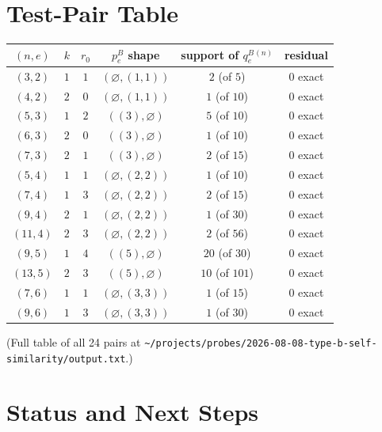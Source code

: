 \documentclass[11pt]{article}
\theoremstyle{remark}
\newcommand{\qeB}{q_e^B}
\newcommand{\peB}{p_e^B}
\newcommand{\emptyy}{\varnothing}
\begin{document}
\section{Test-Pair Table}

\begin{center}
\begin{tabular}{|c|c|c|c|c|c|}
\hline
$(n, e)$ & $k$ & $r_0$ & $\peB$ shape & support of $\qeB^{(n)}$ & residual \\
\hline
$(3, 2)$  & $1$ & $1$ & $(\emptyy, (1,1))$ & $2$ (of $5$)   & $0$ exact \\
$(4, 2)$  & $2$ & $0$ & $(\emptyy, (1,1))$ & $1$ (of $10$)  & $0$ exact \\
$(5, 3)$  & $1$ & $2$ & $((3), \emptyy)$   & $5$ (of $10$)  & $0$ exact \\
$(6, 3)$  & $2$ & $0$ & $((3), \emptyy)$   & $1$ (of $10$)  & $0$ exact \\
$(7, 3)$  & $2$ & $1$ & $((3), \emptyy)$   & $2$ (of $15$)  & $0$ exact \\
$(5, 4)$  & $1$ & $1$ & $(\emptyy, (2,2))$ & $1$ (of $10$)  & $0$ exact \\
$(7, 4)$  & $1$ & $3$ & $(\emptyy, (2,2))$ & $2$ (of $15$)  & $0$ exact \\
$(9, 4)$  & $2$ & $1$ & $(\emptyy, (2,2))$ & $1$ (of $30$)  & $0$ exact \\
$(11, 4)$ & $2$ & $3$ & $(\emptyy, (2,2))$ & $2$ (of $56$)  & $0$ exact \\
$(9, 5)$  & $1$ & $4$ & $((5), \emptyy)$   & $20$ (of $30$) & $0$ exact \\
$(13, 5)$ & $2$ & $3$ & $((5), \emptyy)$   & $10$ (of $101$)& $0$ exact \\
$(7, 6)$  & $1$ & $1$ & $(\emptyy, (3,3))$ & $1$ (of $15$)  & $0$ exact \\
$(9, 6)$  & $1$ & $3$ & $(\emptyy, (3,3))$ & $1$ (of $30$)  & $0$ exact \\
\hline
\end{tabular}
\end{center}

(Full table of all 24 pairs at \verb|~/projects/probes/2026-08-08-type-b-self-similarity/output.txt|.)

\section{Status and Next Steps}
\end{document}
